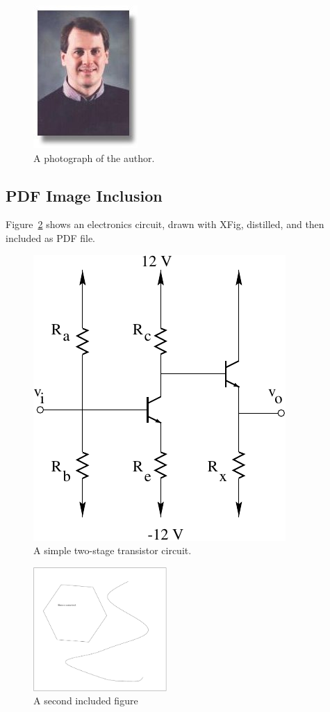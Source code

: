 \documentclass{article}
\begin{document}
\begin{figure}
  \begin{center}
    \includegraphics{mwicks.jpeg}
  \end{center}

  \caption{A photograph of the author.}
  \label{fig:author}
\end{figure}

\subsection{PDF Image Inclusion}
Figure~\ref{fig:circuit} shows
an electronics circuit,
drawn with XFig, distilled,
and then included as PDF file.
\begin{figure}
  \begin{center}
     \includegraphics{transistor}
  \end{center}

  \caption{A simple two-stage transistor circuit.}
  \label{fig:circuit}
\end{figure}

\begin{figure}
  \begin{center}
     \includegraphics[width=2.0in]{something}
  \end{center}

  \caption{A second included figure}
  \label{fig:something}
\end{figure}
\end{document}
